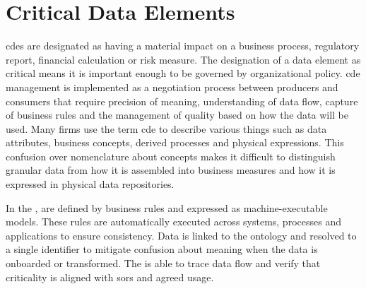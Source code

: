 \section{Critical Data Elements}\label{sec:ekgmm-b-4-5} %

\Glspl{cde} are designated as having a material impact on a business process, regulatory report,
financial calculation or risk measure.
The designation of a data element as critical means it is important enough to be governed by organizational policy.
\Gls{cde} management is implemented as a negotiation process between producers and consumers that require
precision of meaning, understanding of data flow, capture of business rules and the management of quality based on
how the data will be used.
Many firms use the term \gls{cde} to describe various things such as data attributes, business concepts,
derived processes and physical expressions.
This confusion over nomenclature about concepts makes it difficult to distinguish granular data from how it is
assembled into business measures and how it is expressed in physical data repositories.

\ekgmmContextSection

In the ,
 are defined by  business rules and expressed as
machine-executable models.
These rules are automatically executed across systems, processes and applications to ensure consistency.
Data is linked to the ontology and resolved to a single identifier to mitigate confusion about meaning when the
data is onboarded or transformed.
The  is able to trace data flow and verify that criticality is aligned with \glspl{sor}
and agreed usage.

